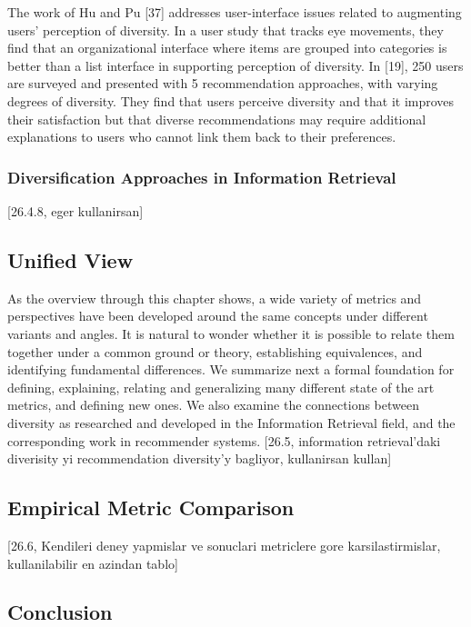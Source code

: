 The work of Hu and Pu [37] addresses user-interface issues related to augmenting users’ perception of diversity. In a user study that tracks eye movements, they find that an organizational interface where items are grouped into categories is better than a list interface in supporting perception of diversity. In [19], 250 users are surveyed and presented with 5 recommendation approaches, with varying degrees of diversity. They find that users perceive diversity and that it improves their satisfaction but that diverse recommendations may require additional explanations to users who cannot link them back to their preferences.

\subsubsection{Diversification Approaches in Information Retrieval}

[26.4.8, eger kullanirsan]

\subsection{Unified View}

As the overview through this chapter shows, a wide variety of metrics and perspectives have been developed around the same concepts under different variants and angles. It is natural to wonder whether it is possible to relate them together under a common ground or theory, establishing equivalences, and identifying fundamental differences. We summarize next a formal foundation for defining, explaining, relating and generalizing many different state of the art metrics, and defining new ones. We also examine the connections between diversity as researched and developed in the Information Retrieval field, and the corresponding work in recommender systems.
[26.5, information retrieval'daki diverisity yi recommendation diversity'y bagliyor, kullanirsan kullan]

\subsection{Empirical Metric Comparison}
[26.6, Kendileri deney yapmislar ve sonuclari metriclere gore karsilastirmislar, kullanilabilir en azindan tablo]

\subsection{Conclusion}

